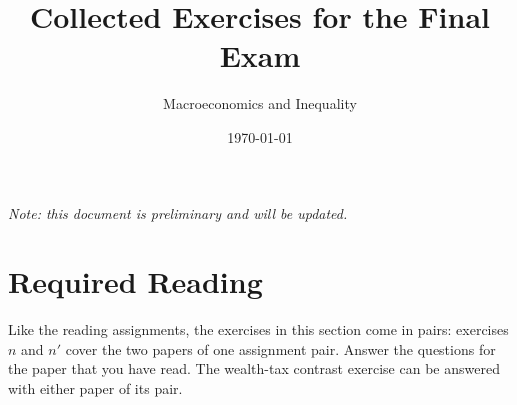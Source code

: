 \documentclass[12pt,a4paper,addpoints]{exam}
\title{Collected Exercises for the Final Exam}
\author{Macroeconomics and Inequality}
\date{\today}
\begin{document}
\maketitle

\begin{center}
    \emph{Note: this document is preliminary and will be updated.}
\end{center}

\clearpage

\section{Required Reading}

\newcommand{\primedquestion}{\addtocounter{question}{-1}\renewcommand{\thequestion}{\arabic{question}$'$}}
\newcommand{\unprimedquestion}{\renewcommand{\thequestion}{\arabic{question}}}

Like the reading assignments, the exercises in this section come in pairs:
exercises $n$ and $n'$ cover the two papers of one assignment pair. Answer the
questions for the paper that you have read. The wealth-tax contrast exercise can
be answered with either paper of its pair.

\begin{questions}

\primedquestion

\unprimedquestion

\primedquestion

\unprimedquestion


\primedquestion

\unprimedquestion

\primedquestion

\unprimedquestion
\end{questions}

\clearpage

\end{document}
